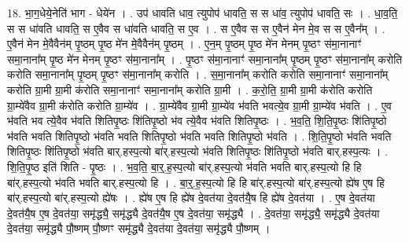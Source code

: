 \documentclass[17pt]{extarticle}
\begin{document}
18. भा॒ग॒धेये॒नेति॑ भाग - धेये॑न । . उप॑ धावति धाव॒ त्युपोप॑ धावति॒ स स धा॑व॒ त्युपोप॑ धावति॒ सः । . धा॒व॒ति॒ स स धा॑वति धावति॒ स ए॒वैव स धा॑वति धावति॒ स ए॒व । . स ए॒वैव स स ए॒वैन॑ मेन मे॒व स स ए॒वैन᳚म् । . ए॒वैन॑ मेन मे॒वैवैन॑म् पृ॒ष्ठम् पृ॒ष्ठ मे॑न मे॒वैवैन॑म् पृ॒ष्ठम् । . ए॒न॒म् पृ॒ष्ठम् पृ॒ष्ठ मे॑न मेनम् पृ॒ष्ठꣳ स॑मा॒नानाꣳ॑ समा॒नाना᳚म् पृ॒ष्ठ मे॑न मेनम् पृ॒ष्ठꣳ स॑मा॒नाना᳚म् । . पृ॒ष्ठꣳ स॑मा॒नानाꣳ॑ समा॒नाना᳚म् पृ॒ष्ठम् पृ॒ष्ठꣳ स॑मा॒नाना᳚म् करोति करोति समा॒नाना᳚म् पृ॒ष्ठम् पृ॒ष्ठꣳ स॑मा॒नाना᳚म् करोति । . स॒मा॒नाना᳚म् करोति करोति समा॒नानाꣳ॑ समा॒नाना᳚म् करोति ग्रा॒मी ग्रा॒मी क॑रोति समा॒नानाꣳ॑ समा॒नाना᳚म् करोति ग्रा॒मी । . क॒रो॒ति॒ ग्रा॒मी ग्रा॒मी क॑रोति करोति ग्रा॒म्ये॑वैव ग्रा॒मी क॑रोति करोति ग्रा॒म्ये॑व । . ग्रा॒म्ये॑वैव ग्रा॒मी ग्रा॒म्ये॑व भ॑वति भवत्ये॒व ग्रा॒मी ग्रा॒म्ये॑व भ॑वति । . ए॒व भ॑वति भव त्ये॒वैव भ॑वति शितिपृ॒ष्ठः शि॑तिपृ॒ष्ठो भ॑व त्ये॒वैव भ॑वति शितिपृ॒ष्ठः । . भ॒व॒ति॒ शि॒ति॒पृ॒ष्ठः शि॑तिपृ॒ष्ठो भ॑वति भवति शितिपृ॒ष्ठो भ॑वति भवति शितिपृ॒ष्ठो भ॑वति भवति शितिपृ॒ष्ठो भ॑वति । . शि॒ति॒पृ॒ष्ठो भ॑वति भवति शितिपृ॒ष्ठः शि॑तिपृ॒ष्ठो भ॑वति बार्.हस्प॒त्यो बा॑र्.हस्प॒त्यो भ॑वति शितिपृ॒ष्ठः शि॑तिपृ॒ष्ठो भ॑वति बार्.हस्प॒त्यः । . शि॒ति॒पृ॒ष्ठ इति॑ शिति - पृ॒ष्ठः । . भ॒व॒ति॒ बा॒र्॒.ह॒स्प॒त्यो बा॑र्.हस्प॒त्यो भ॑वति भवति बार्.हस्प॒त्यो हि हि बा॑र्.हस्प॒त्यो भ॑वति भवति बार्.हस्प॒त्यो हि । . बा॒र्॒.ह॒स्प॒त्यो हि हि बा॑र्.हस्प॒त्यो बा॑र्.हस्प॒त्यो ह्ये॑ष ए॒ष हि बा॑र्.हस्प॒त्यो बा॑र्.हस्प॒त्यो ह्ये॑षः । . ह्ये॑ष ए॒ष हि ह्ये॑ष दे॒वत॑या दे॒वत॑यै॒ष हि ह्ये॑ष दे॒वत॑या । . ए॒ष दे॒वत॑या दे॒वत॑यै॒ष ए॒ष दे॒वत॑या॒ समृ॑द्ध्यै॒ समृ॑द्ध्यै दे॒वत॑यै॒ष ए॒ष दे॒वत॑या॒ समृ॑द्ध्यै । . दे॒वत॑या॒ समृ॑द्ध्यै॒ समृ॑द्ध्यै दे॒वत॑या दे॒वत॑या॒ समृ॑द्ध्यै पौ॒ष्णम् पौ॒ष्णꣳ समृ॑द्ध्यै दे॒वत॑या दे॒वत॑या॒ समृ॑द्ध्यै पौ॒ष्णम् । \newline
\end{document}
